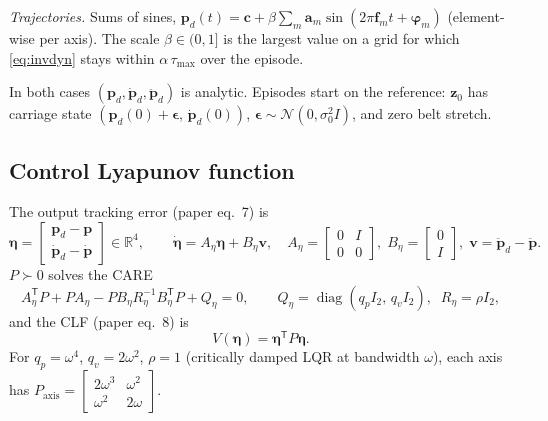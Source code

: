 \emph{Trajectories.} Sums of sines,
$\mathbf{p}_d(t) = \mathbf{c} + \beta \sum_{m} \mathbf{a}_m \sin(2\pi \mathbf{f}_m t + \boldsymbol{\varphi}_m)$
(element-wise per axis). The scale $\beta \in (0,1]$ is the largest value on a grid for which
\eqref{eq:invdyn} stays within $\alpha\,\tau_{\max}$ over the episode.

In both cases $(\mathbf{p}_d, \dot{\mathbf{p}}_d, \ddot{\mathbf{p}}_d)$ is analytic.
Episodes start on the reference: $\mathbf{z}_0$ has carriage state
$(\mathbf{p}_d(0) + \boldsymbol{\epsilon},\, \dot{\mathbf{p}}_d(0))$, $\boldsymbol{\epsilon} \sim \mathcal{N}(0, \sigma_0^2 I)$,
and zero belt stretch.

\subsection*{Control Lyapunov function}
The output tracking error (paper eq.~7) is
\begin{equation}
\boldsymbol{\eta} =
\begin{bmatrix} \mathbf{p}_d - \mathbf{p} \\ \dot{\mathbf{p}}_d - \dot{\mathbf{p}} \end{bmatrix} \in \mathbb{R}^4,
\qquad
\dot{\boldsymbol{\eta}} = A_\eta \boldsymbol{\eta} + B_\eta \mathbf{v}, \quad
A_\eta = \begin{bmatrix} 0 & I \\ 0 & 0 \end{bmatrix}, \;
B_\eta = \begin{bmatrix} 0 \\ I \end{bmatrix}, \;
\mathbf{v} = \ddot{\mathbf{p}}_d - \ddot{\mathbf{p}}.
\end{equation}
$P \succ 0$ solves the CARE
\begin{equation}
A_\eta^{\mathsf T} P + P A_\eta - P B_\eta R_\eta^{-1} B_\eta^{\mathsf T} P + Q_\eta = 0,
\qquad
Q_\eta = \operatorname{diag}(q_p I_2,\, q_v I_2), \;\; R_\eta = \rho I_2,
\end{equation}
and the CLF (paper eq.~8) is
\begin{equation}
V(\boldsymbol{\eta}) = \boldsymbol{\eta}^{\mathsf T} P \boldsymbol{\eta}.
\end{equation}
For $q_p = \omega^4$, $q_v = 2\omega^2$, $\rho = 1$ (critically damped LQR at bandwidth $\omega$), each axis has
$P_{\text{axis}} = \begin{bmatrix} 2\omega^3 & \omega^2 \\ \omega^2 & 2\omega \end{bmatrix}$.

